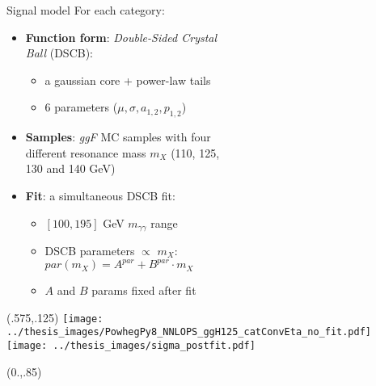 \documentclass[10pt,UKenglish, leqno, xcolor = dvipsnames]{beamer}
\begin{document}
	\begin{frame}{Signal model}
		\vfill
		For each category:
		\begin{itemize}
			\item \textbf{Function form}: \textit{Double-Sided Crystal\\ Ball} (DSCB):
			\begin{itemize}
				\item a gaussian core + power-law tails
				\item 6 parameters ($\mu, \sigma, a_{1,2}, p_{1,2}$)
			\end{itemize}
			\item \textbf{Samples}: \textit{ggF} MC samples with four\\ different resonance mass $m_X$ (110, 125,\\ 130 and 140 GeV)
			\item \textbf{Fit}: a simultaneous DSCB fit:
			\begin{itemize}
				\item $[100,195]$ GeV $m_{\gamma\gamma}$ range
				\item DSCB parameters $\propto$ $m_X$:\\
				$par(m_X) = A^{par} + B^{par}\cdot m_X$
				\item $A$ and $B$ params fixed after fit\\
			\end{itemize}
		\end{itemize}
		\vspace{.5cm}
		\vfill
		\begin{textblock}{1}(.575,.125)
			\texttt{[image: ../thesis\_images/PowhegPy8\_NNLOPS\_ggH125\_catConvEta\_no\_fit.pdf]}\\
			\texttt{[image: ../thesis\_images/sigma\_postfit.pdf]}\\
		\end{textblock}	
		\begin{textblock}{1}(0.,.85)
			\begin{figure}
			\end{figure}
		\end{textblock}
	\end{frame}
\end{document}
